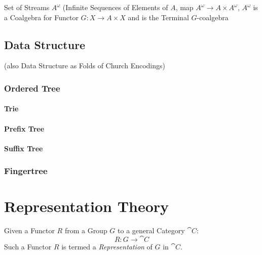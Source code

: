Set of Streams $A^\omega$ (Infinite Sequences of Elements of $A$, map
$A^\omega \rightarrow A \times A^\omega$, $A^\omega$ is a Coalgebra
for Functor $G : X \rightarrow A \times X$ and is the Terminal
$G$-coalgebra



\subsection{Data Structure}\label{sec:data_structure}

(also Data Structure as Folds of Church Encodings) %



\subsubsection{Ordered Tree}\label{sec:ordered_tree}

\paragraph{Trie}\label{sec:trie}

\paragraph{Prefix Tree}\label{sec:prefix_tree}

\paragraph{Suffix Tree}\label{sec:suffix_tree}



\subsubsection{Fingertree}\label{sec:fingertree}



\section{Representation Theory}\label{sec:representation_theory}

Given a Functor $R$ from a Group $G$ to a general Category
$\cat{C}$:
\[
    R : G \rightarrow \cat{C}
\]
Such a Functor $R$ is termed a \emph{Representation} of $G$ in
$\cat{C}$.

